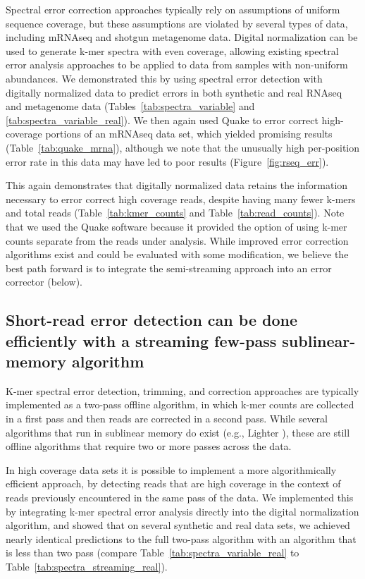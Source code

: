 \documentclass{article}
\begin{document}
Spectral error correction approaches typically rely on assumptions of
uniform sequence coverage, but these assumptions are violated by
several types of data, including mRNAseq and shotgun metagenome data.
Digital normalization can be used to generate k-mer spectra with even
coverage, allowing existing spectral error analysis approaches to be
applied to data from samples with non-uniform abundances.  We
demonstrated this by using spectral error detection with digitally
normalized data to predict errors in both synthetic and real RNAseq
and metagenome data (Tables~\ref{tab:spectra_variable} and
\ref{tab:spectra_variable_real}).  We then again used Quake to error
correct high-coverage portions of an mRNAseq data set, which yielded
promising results (Table~\ref{tab:quake_mrna}), although we note
that the unusually high per-position error rate in this data
may have led to poor results (Figure~\ref{fig:rseq_err}).

This again demonstrates that digitally normalized data retains the
information necessary to error correct high coverage reads, despite
having many fewer k-mers and total reads (Table~\ref{tab:kmer_counts}
and Table~\ref{tab:read_counts}).  Note that we used the Quake software
because it provided the option of using k-mer counts separate from the
reads under analysis.  While improved error correction algorithms
exist and could be evaluated with some modification, we believe the
best path forward is to integrate the semi-streaming approach into
an error corrector (below).

\subsection{Short-read error detection can be done efficiently with a streaming few-pass sublinear-memory algorithm}

K-mer spectral error detection, trimming, and correction approaches
are typically implemented as a two-pass offline algorithm, in which
k-mer counts are collected in a first pass and then reads are
corrected in a second pass.  While several algorithms that run in
sublinear memory do exist (e.g., Lighter \cite{lighter}), these are
still offline algorithms that require two or more passes across
the data.

In high coverage data sets it is possible to implement a more
algorithmically efficient approach, by detecting reads that are high
coverage in the context of reads previously encountered in the same
pass of the data.  We implemented this by integrating k-mer spectral
error analysis directly into the digital normalization algorithm, and
showed that on several synthetic and real data sets, we achieved
nearly identical predictions to the full two-pass algorithm with an
algorithm that is less than two pass (compare
Table~\ref{tab:spectra_variable_real} to
Table~\ref{tab:spectra_streaming_real}).
\end{document}
